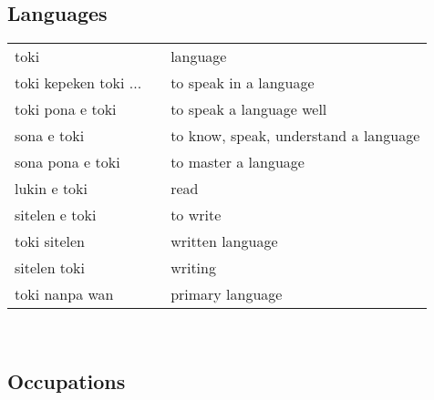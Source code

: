 \subsection{Languages}

\begin{supertabular}{p{4,5cm}|ll}
    toki                  &  & language                              \\
    toki kepeken toki ... &  & to speak in a language                \\
    toki pona e toki      &  & to speak a language well              \\
    sona e toki           &  & to know, speak, understand a language \\
    sona pona e toki      &  & to master a language                  \\
    lukin e toki          &  & read                                  \\
    sitelen e toki        &  & to write                              \\
    toki sitelen          &  & written language                      \\
    sitelen toki          &  & writing                               \\
    toki nanpa wan        &  & primary language                      \\
\end{supertabular} \\

\subsection{Occupations}

